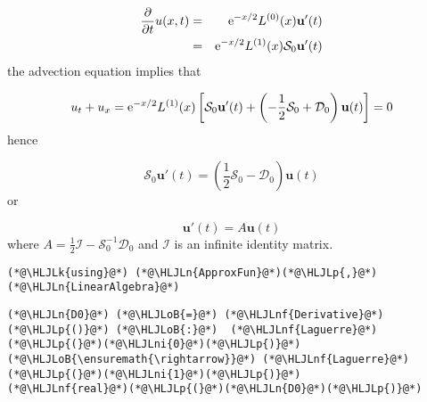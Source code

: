 \documentclass[12pt,a4paper]{article}
\newcommand{\HLJLk}[1]{\textcolor[RGB]{148,91,176}{\textbf{#1}}}
\newcommand{\HLJLn}[1]{#1}
\newcommand{\HLJLnf}[1]{\textcolor[RGB]{66,102,213}{#1}}
\newcommand{\HLJLni}[1]{\textcolor[RGB]{59,151,46}{#1}}
\newcommand{\HLJLoB}[1]{\textcolor[RGB]{102,102,102}{\textbf{#1}}}
\newcommand{\HLJLp}[1]{#1}
\begin{document}
\begin{eqnarray*}
\frac{\partial}{\partial t}u(x,t) &=& {\rm e}^{-x/2}L^{(0)}(x)\mathbf{u}'(t)  \\
&=& {\rm e}^{-x/2}L^{(1)}(x)\mathcal{S}_0\mathbf{u}'(t)
\end{eqnarray*}
the advection equation implies that

\[
u_t + u_x =
{\rm e}^{-x/2}L^{(1)}(x)\left[\mathcal{S}_0\mathbf{u}'(t)+  \left(-\frac{1}{2}\mathcal{S}_0 + \mathcal{D}_0\right)\mathbf{u}(t)  \right] = 0
\]
hence

\[
\mathcal{S}_0\mathbf{u}'(t) = \left(\frac{1}{2}\mathcal{S}_0 - \mathcal{D}_0\right)\mathbf{u}(t)
\]
or

\[
\mathbf{u}'(t) = A\mathbf{u}(t)
\]
where $A = \frac{1}{2}\mathcal{I} - \mathcal{S}_0^{-1}\mathcal{D}_0$ and $\mathcal{I}$ is an infinite identity matrix.


\begin{lstlisting}
(*@\HLJLk{using}@*) (*@\HLJLn{ApproxFun}@*)(*@\HLJLp{,}@*) (*@\HLJLn{LinearAlgebra}@*)
\end{lstlisting}


\begin{lstlisting}
(*@\HLJLn{D0}@*) (*@\HLJLoB{=}@*) (*@\HLJLnf{Derivative}@*)(*@\HLJLp{()}@*) (*@\HLJLoB{:}@*)  (*@\HLJLnf{Laguerre}@*)(*@\HLJLp{(}@*)(*@\HLJLni{0}@*)(*@\HLJLp{)}@*) (*@\HLJLoB{\ensuremath{\rightarrow}}@*) (*@\HLJLnf{Laguerre}@*)(*@\HLJLp{(}@*)(*@\HLJLni{1}@*)(*@\HLJLp{)}@*)
(*@\HLJLnf{real}@*)(*@\HLJLp{(}@*)(*@\HLJLn{D0}@*)(*@\HLJLp{)}@*)
\end{lstlisting}
\end{document}
